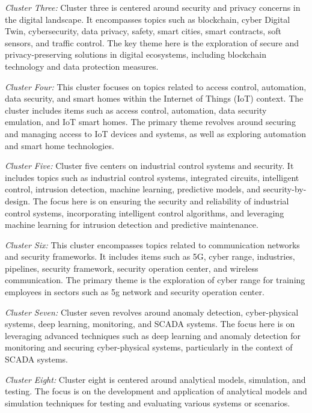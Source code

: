 \textit{Cluster Three:}
Cluster three is centered around security and privacy concerns in the digital landscape. It encompasses topics such as blockchain, cyber Digital Twin, cybersecurity, data privacy, safety, smart cities, smart contracts, soft sensors, and traffic control. The key theme here is the exploration of secure and privacy-preserving solutions in digital ecosystems, including blockchain technology and data protection measures.

\textit{Cluster Four:}
This cluster focuses on topics related to access control, automation, data security, and smart homes within the Internet of Things (IoT) context. The cluster includes items such as access control, automation, data security emulation, and IoT smart homes. The primary theme revolves around securing and managing access to IoT devices and systems, as well as exploring automation and smart home technologies.

\textit{Cluster Five:}
Cluster five centers on industrial control systems and security. It includes topics such as industrial control systems, integrated circuits, intelligent control, intrusion detection, machine learning, predictive models, and security-by-design. The focus here is on ensuring the security and reliability of industrial control systems, incorporating intelligent control algorithms, and leveraging machine learning for intrusion detection and predictive maintenance.

\textit{Cluster Six:}
This cluster encompasses topics related to communication networks and security frameworks. It includes items such as 5G, cyber range, industries, pipelines, security framework, security operation center, and wireless communication. The primary theme is the exploration of cyber range for training employees in sectors such as 5g network and security operation center. 



\textit{Cluster Seven:}
Cluster seven revolves around anomaly detection, cyber-physical systems, deep learning, monitoring, and SCADA systems. The focus here is on leveraging advanced techniques such as deep learning and anomaly detection for monitoring and securing cyber-physical systems, particularly in the context of SCADA systems.

\textit{Cluster Eight:}
Cluster eight is centered around analytical models, simulation, and testing. The focus is on the development and application of analytical models and simulation techniques for testing and evaluating various systems or scenarios.